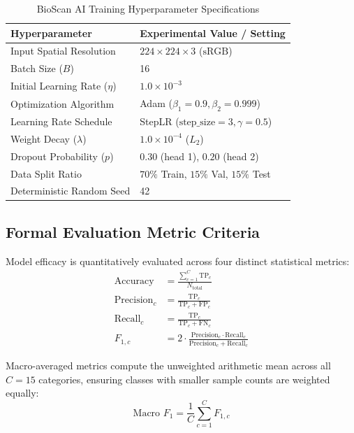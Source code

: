 \documentclass[11pt,a4paper]{article}
\begin{document}
\begin{table}[htbp]
\centering
\caption{BioScan AI Training Hyperparameter Specifications}
\label{tab:hyperparameters}
\footnotesize
\begin{tabular}{l l}
\toprule
\textbf{Hyperparameter} & \textbf{Experimental Value / Setting} \\
\midrule
Input Spatial Resolution & $224 \times 224 \times 3$ ($\text{sRGB}$) \\
Batch Size ($B$) & 16 \\
Initial Learning Rate ($\eta$) & $1.0 \times 10^{-3}$ \\
Optimization Algorithm & Adam ($\beta_1 = 0.9, \beta_2 = 0.999$) \\
Learning Rate Schedule & StepLR ($\text{step\_size}=3, \gamma=0.5$) \\
Weight Decay ($\lambda$) & $1.0 \times 10^{-4}$ ($L_2$) \\
Dropout Probability ($p$) & $0.30$ (head 1), $0.20$ (head 2) \\
Data Split Ratio & $70\%$ Train, $15\%$ Val, $15\%$ Test \\
Deterministic Random Seed & 42 \\
\bottomrule
\end{tabular}
\end{table}

\subsection{Formal Evaluation Metric Criteria}
Model efficacy is quantitatively evaluated across four distinct statistical metrics:
\begin{align}
\text{Accuracy} &= \frac{\sum_{c=1}^C \text{TP}_c}{N_{\text{total}}} \\
\text{Precision}_c &= \frac{\text{TP}_c}{\text{TP}_c + \text{FP}_c} \\
\text{Recall}_c &= \frac{\text{TP}_c}{\text{TP}_c + \text{FN}_c} \\
F_{1, c} &= 2 \cdot \frac{\text{Precision}_c \cdot \text{Recall}_c}{\text{Precision}_c + \text{Recall}_c}
\end{align}

Macro-averaged metrics compute the unweighted arithmetic mean across all $C=15$ categories, ensuring classes with smaller sample counts are weighted equally:
\begin{equation}
\text{Macro } F_1 = \frac{1}{C} \sum_{c=1}^C F_{1, c}
\end{equation}
\end{document}

